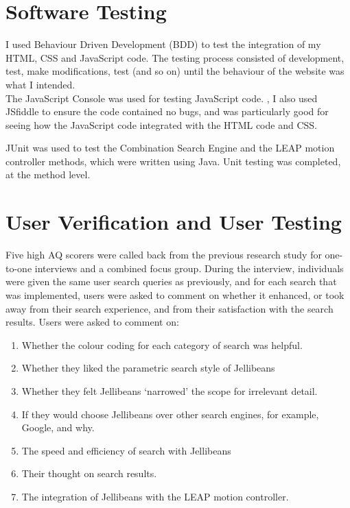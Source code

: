 \documentclass[a4paper, 11pt]{article}
\begin{document}
\section{Software Testing}

I used Behaviour Driven Development (BDD) to test the integration of my HTML, CSS and JavaScript code. The testing process consisted of development, test, make modifications, test (and so on) until the behaviour of the website was what I intended.\\

\vspace{5mm}
The JavaScript Console was used for testing JavaScript code. \cite{javascripttesting}, I also used JSfiddle \cite{jsfiddle} to ensure the code contained no bugs, and was particularly good for seeing how the JavaScript code integrated with the HTML code and CSS.

\vspace{5mm}
JUnit was used to test the Combination Search Engine and the LEAP motion controller methods, which were written using Java. Unit testing was completed, at the method level.

\section{User Verification and User Testing}
Five high AQ scorers were called back from the previous research study for one-to-one interviews and a combined focus group. During the interview, individuals were given the same user search queries as previously, and for each search that was implemented, users were asked to comment on whether it enhanced, or took away from their search experience, and from their satisfaction with the search results. Users were asked to comment on:
\begin{enumerate}
\item{Whether the colour coding for each category of search was helpful.}
\item{Whether they liked the parametric search style of Jellibeans}
\item{Whether they felt Jellibeans `narrowed' the scope for irrelevant detail.}
\item{If they would choose Jellibeans over other search engines, for example, Google, and why.}
\item{The speed and efficiency of search with Jellibeans}
\item{Their thought on search results.}
\item{The integration of Jellibeans with the LEAP motion controller.}
\end{enumerate}
\end{document}
